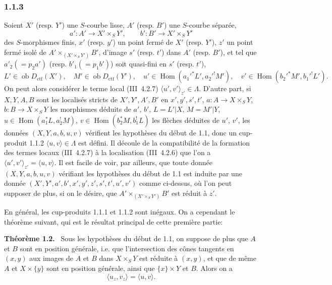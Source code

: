 \documentclass[11pt]{article}
\newenvironment{statement}[1]{\par\medskip\noindent\textbf{#1.}\ }{\par\medskip}
\DeclareMathOperator{\Hom}{Hom}
\newcommand{\ob}{\operatorname{ob}}
\providecommand{\ctf}{\mathrm{ctf}}
\providecommand{\Hom}{\operatorname{Hom}}
\providecommand{\ob}{\operatorname{ob}}
\providecommand{\Hom}{\operatorname{Hom}}
\begin{document}
\subsubsection*{1.1.3}
Soient $X'$ (resp. $Y'$) une $S$-courbe lisse, $A'$ (resp. $B'$) une $S$-courbe séparée,
\[
a':A'\longrightarrow X'\times_S Y',
\qquad
b':B'\longrightarrow X'\times_S Y'
\]
des $S$-morphismes finis, $x'$ (resp. $y'$) un point fermé de $X'$ (resp. $Y'$), $z'$ un point fermé isolé de $A'\times_{(X'\times_S Y')}B'$, d'image $s'$ (resp. $t'$) dans $A'$ (resp. $B'$), et tel que $a'_2(=p_2a')$ (resp. $b'_1(=p_1b')$) soit quasi-fini en $s'$ (resp. $t'$),
\[
L'\in\ob D_{\ctf}(X'),\quad M'\in\ob D_{\ctf}(Y'),\quad
u'\in\Hom(a_1'^*L',a_2'^!M'),\quad v'\in\Hom(b_2'^*M',b_1'^!L').
\]
On peut alors considérer le terme local (III~4.2.7) $\langle u',v'\rangle_{z'}\in\Lambda$. D'autre part, si $X,Y,A,B$ sont les localisés stricts de $X',Y',A',B'$ en $x',y',s',t'$, $a:A\to X\times_S Y$, $b:B\to X\times_SY$ les morphismes déduits de $a'$, $b'$, $L=L'|X$, $M=M'|Y$, $u\in\Hom(a_1^*L,a_2^!M)$, $v\in\Hom(b_2^*M,b_1^!L)$ les flèches déduites de $u'$, $v'$, les données $(X,Y,a,b,u,v)$ vérifient les hypothèses du début de 1.1, donc un cup-produit 1.1.2 $\langle u,v\rangle\in\Lambda$ est défini. Il découle de la compatibilité de la formation des termes locaux (III~4.2.7) à la localisation (III~4.2.6) que l'on a $\langle u',v'\rangle_{z'}=\langle u,v\rangle$. Il est facile de voir, par ailleurs, que toute donnée $(X,Y,a,b,u,v)$ vérifiant les hypothèses du début de 1.1 est induite par une donnée $(X',Y',a',b',x',y',z',s',t',u',v')$ comme ci-dessus, où l'on peut supposer de plus, si on le désire, que $A'\times_{(X'\times_S Y')}B'$ est réduit à $z'$.

En général, les cup-produits 1.1.1 et 1.1.2 sont inégaux. On a cependant le théorème suivant, qui est le résultat principal de cette première partie:

\begin{statement}{Théorème 1.2}
Sous les hypothèses du début de 1.1, on suppose de plus que $A$ et $B$ sont en position générale, i.e. que l'intersection des cônes tangents en $(x,y)$ aux images de $A$ et $B$ dans $X\times_S Y$ est réduite à $(x,y)$, et que de même $A$ et $X\times\{y\}$ sont en position générale, ainsi que $\{x\}\times Y$ et $B$. Alors on a
\begin{equation}\tag{1.2.1}
\langle u_z,v_z\rangle=\langle u,v\rangle.
\end{equation}
\end{statement}
\end{document}
